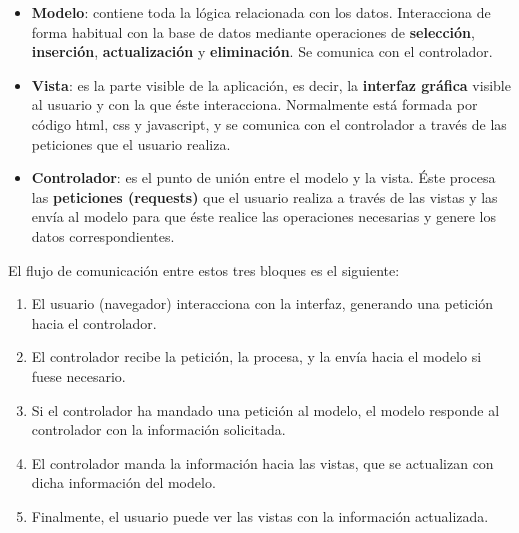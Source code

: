     \begin{itemize}
        \item \textbf{Modelo}: contiene toda la lógica relacionada con los datos.
        Interacciona de forma habitual con la base de datos mediante operaciones de
        \textbf{selección}, \textbf{inserción}, \textbf{actualización} y \textbf{eliminación}.
        Se comunica con el controlador.
        \item \textbf{Vista}: es la parte visible de la aplicación, es decir, la 
        \textbf{interfaz gráfica} visible al usuario y con la que éste interacciona.
        Normalmente está formada por código html, css y javascript, y se comunica con el
        controlador a través de las peticiones que el usuario realiza.
        \item \textbf{Controlador}: es el punto de unión entre el modelo y la vista. Éste
        procesa las \textbf{peticiones (requests)} que el usuario realiza a través de las
        vistas y las envía al modelo para que éste realice las operaciones necesarias y
        genere los datos correspondientes.
    \end{itemize}

El flujo de comunicación entre estos tres bloques es el siguiente:

    \begin{enumerate}
        \item El usuario (navegador) interacciona con la interfaz, generando una petición
        hacia el controlador.
        \item El controlador recibe la petición, la procesa, y la envía hacia el modelo
        si fuese necesario.
        \item Si el controlador ha mandado una petición al modelo, el modelo responde al
        controlador con la información solicitada. 
        \item El controlador manda la información hacia las vistas, que se actualizan con
        dicha información del modelo.
        \item Finalmente, el usuario puede ver las vistas con la información actualizada.
    \end{enumerate}

